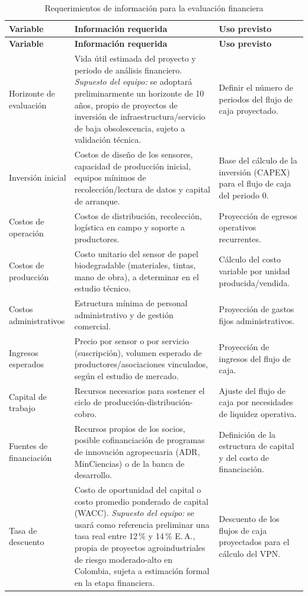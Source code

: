 \documentclass[11pt,a4paper]{article}
\newcommand{\supuesto}[1]{\textit{Supuesto del equipo: #1}}
\begin{document}
\begin{longtable}{L{3.2cm}L{5.6cm}L{5.6cm}}
\caption{Requerimientos de información para la evaluación financiera}\label{tab:financiero}\\
\toprule
\textbf{Variable} & \textbf{Información requerida} & \textbf{Uso previsto}\\
\midrule
\endfirsthead
\toprule
\textbf{Variable} & \textbf{Información requerida} & \textbf{Uso previsto}\\
\midrule
\endhead
Horizonte de evaluación & Vida útil estimada del proyecto y periodo de análisis financiero. \supuesto{} se adoptará preliminarmente un horizonte de 10 años, propio de proyectos de inversión de infraestructura/servicio de baja obsolescencia, sujeto a validación técnica. & Definir el número de periodos del flujo de caja proyectado.\\
Inversión inicial & Costos de diseño de los sensores, capacidad de producción inicial, equipos mínimos de recolección/lectura de datos y capital de arranque. & Base del cálculo de la inversión (CAPEX) para el flujo de caja del periodo 0.\\
Costos de operación & Costos de distribución, recolección, logística en campo y soporte a productores. & Proyección de egresos operativos recurrentes.\\
Costos de producción & Costo unitario del sensor de papel biodegradable (materiales, tintas, mano de obra), a determinar en el estudio técnico. & Cálculo del costo variable por unidad producida/vendida.\\
Costos administrativos & Estructura mínima de personal administrativo y de gestión comercial. & Proyección de gastos fijos administrativos.\\
Ingresos esperados & Precio por sensor o por servicio (suscripción), volumen esperado de productores/asociaciones vinculados, según el estudio de mercado. & Proyección de ingresos del flujo de caja.\\
Capital de trabajo & Recursos necesarios para sostener el ciclo de producción-distribución-cobro. & Ajuste del flujo de caja por necesidades de liquidez operativa.\\
Fuentes de financiación & Recursos propios de los socios, posible cofinanciación de programas de innovación agropecuaria (ADR, MinCiencias) o de la banca de desarrollo. & Definición de la estructura de capital y del costo de financiación.\\
Tasa de descuento & Costo de oportunidad del capital o costo promedio ponderado de capital (WACC). \supuesto{} se usará como referencia preliminar una tasa real entre 12\,\% y 14\,\% E.\,A., propia de proyectos agroindustriales de riesgo moderado-alto en Colombia, sujeta a estimación formal en la etapa financiera. & Descuento de los flujos de caja proyectados para el cálculo del VPN.\\

\end{longtable}
\end{document}
